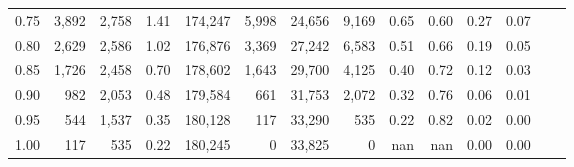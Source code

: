 \begin{tabular}{rrrrrrrrrrrrrr}
0.75 &   3,892 &  2,758 &    1.41 &  174,247 &    5,998 &  24,656 &   9,169 &  0.65 &  0.60 &  0.27 &      0.07 \\
0.80 &   2,629 &  2,586 &    1.02 &  176,876 &    3,369 &  27,242 &   6,583 &  0.51 &  0.66 &  0.19 &      0.05 \\
0.85 &   1,726 &  2,458 &    0.70 &  178,602 &    1,643 &  29,700 &   4,125 &  0.40 &  0.72 &  0.12 &      0.03 \\
0.90 &     982 &  2,053 &    0.48 &  179,584 &      661 &  31,753 &   2,072 &  0.32 &  0.76 &  0.06 &      0.01 \\
0.95 &     544 &  1,537 &    0.35 &  180,128 &      117 &  33,290 &     535 &  0.22 &  0.82 &  0.02 &      0.00 \\
1.00 &     117 &    535 &    0.22 &  180,245 &        0 &  33,825 &       0 &   nan &   nan &  0.00 &      0.00 \\
\bottomrule
\end{tabular}
